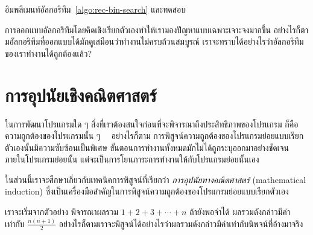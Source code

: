 \begin{quiz}{}
อิม{\wbr}พลี{\wbr}เมนท์อัล{\wbr}กอ{\wbr}ริ{\wbr}ทึม~\ref{algo:rec-bin-search} และ{\wbr}ทดสอบ{\wbr}
\end{quiz}

การ{\wbr}ออกแบบ{\wbr}อัล{\wbr}กอ{\wbr}ริ{\wbr}ทึม{\wbr}โดย{\wbr}คิด{\wbr}เชิง{\wbr}เรียก{\wbr}ตัวเอง{\wbr}ทำ{\wbr}ให้{\wbr}เรา{\wbr}มอง{\wbr}ปัญหา{\wbr}แบบ{\wbr}เฉพาะเจาะจง{\wbr}มาก{\wbr}ขึ้น{\wbr}
อย่างไรก็ตาม{\wbr}อัล{\wbr}กอ{\wbr}ริ{\wbr}ทึม{\wbr}ที่{\wbr}ออกแบบ{\wbr}ได้{\wbr}มัก{\wbr}ดู{\wbr}เสมือน{\wbr}ว่า{\wbr}ทำงาน{\wbr}ไม่{\wbr}ครบถ้วน{\wbr}สมบูรณ์{\wbr}
เรา{\wbr}จะ{\wbr}ทราบ{\wbr}ได้{\wbr}อย่างไร{\wbr}ว่า{\wbr}อัล{\wbr}กอ{\wbr}ริ{\wbr}ทึม{\wbr}ของ{\wbr}เรา{\wbr}ทำงาน{\wbr}ได้{\wbr}ถูกต้อง{\wbr}แล้ว?

\section{การ{\wbr}อุปนัย{\wbr}เชิง{\wbr}คณิตศาสตร์}

ใน{\wbr}การ{\wbr}พัฒนา{\wbr}โปรแกรม{\wbr}ใด ๆ สิ่ง{\wbr}ที่{\wbr}เรา{\wbr}ต้อง{\wbr}สนใจ{\wbr}ก่อน{\wbr}ที่{\wbr}จะ{\wbr}พิจารณา{\wbr}ถึง{\wbr}ประสิทธิภาพ{\wbr}ของ{\wbr}โปรแกรม{\wbr}
ก็{\wbr}คือ{\wbr}ความ{\wbr}ถูกต้อง{\wbr}ของ{\wbr}โปรแกรม{\wbr}นั้น ๆ \ \ อย่างไรก็ตาม{\wbr}
การ{\wbr}พิสูจน์{\wbr}ความ{\wbr}ถูกต้อง{\wbr}ของ{\wbr}โปรแกรมย่อย{\wbr}แบบ{\wbr}เรียก{\wbr}ตัวเอง{\wbr}นั้น{\wbr}มี{\wbr}ความ{\wbr}ซับซ้อน{\wbr}เป็นพิเศษ{\wbr}
ขั้นตอน{\wbr}การ{\wbr}ทำงาน{\wbr}ทั้งหมด{\wbr}มัก{\wbr}ไม่{\wbr}ได้{\wbr}ถูก{\wbr}ระบุ{\wbr}ออก{\wbr}มา{\wbr}อย่าง{\wbr}ชัดเจน{\wbr}ภายใน{\wbr}โปรแกรมย่อย{\wbr}นั้น{\wbr}
แต่{\wbr}จะ{\wbr}เป็น{\wbr}การ{\wbr}โยน{\wbr}ภาระ{\wbr}การ{\wbr}ทำงาน{\wbr}ให้{\wbr}กับ{\wbr}โปรแกรมย่อย{\wbr}นั้น{\wbr}เอง{\wbr}

ใน{\wbr}ส่วน{\wbr}นี้{\wbr}เรา{\wbr}จะ{\wbr}ศึกษา{\wbr}เกี่ยวกับ{\wbr}เทคนิค{\wbr}การ{\wbr}พิสูจน์{\wbr}ที่{\wbr}เรียก{\wbr}ว่า {\em การ{\wbr}อุปนัย{\wbr}ทาง{\wbr}คณิตศาสตร์}
(mathematical induction)
ซึ่ง{\wbr}เป็น{\wbr}เครื่องมือ{\wbr}สำคัญ{\wbr}ใน{\wbr}การ{\wbr}พิสูจน์{\wbr}ความ{\wbr}ถูกต้อง{\wbr}ของ{\wbr}โปรแกรมย่อย{\wbr}แบบ{\wbr}เรียก{\wbr}ตัวเอง{\wbr}

เรา{\wbr}จะ{\wbr}เริ่ม{\wbr}จาก{\wbr}ตัวอย่าง พิจารณา{\wbr}ผลรวม $1+2+3+\cdots+n$ ถ้า{\wbr}ยัง{\wbr}พอ{\wbr}จำ{\wbr}ได้{\wbr}
ผลรวม{\wbr}ดังกล่าว{\wbr}มี{\wbr}ค่า{\wbr}เท่า{\wbr}กับ $\frac{n(n+1)}{2}$
อย่างไรก็ตาม{\wbr}เรา{\wbr}จะ{\wbr}พิสูจน์{\wbr}ได้{\wbr}อย่างไร{\wbr}ว่า{\wbr}ผลรวม{\wbr}ดังกล่าว{\wbr}มี{\wbr}ค่า{\wbr}เท่า{\wbr}กับ{\wbr}นิพจน์{\wbr}ที่{\wbr}อ้าง{\wbr}มา{\wbr}จริง{\wbr}

